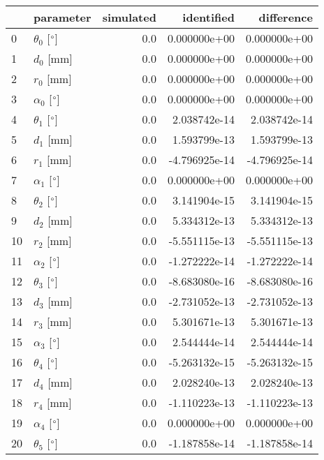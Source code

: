 \documentclass{standalone}%
\begin{document}
%
\normalsize%
\begin{tabular}{llrrr}
\toprule
{} &                 parameter & simulated &    identified &    difference \\
\midrule
0  &  $\theta_{0}$ [$\degree$] &       0.0 &  0.000000e+00 &  0.000000e+00 \\
1  &              $d_{0}$ [mm] &       0.0 &  0.000000e+00 &  0.000000e+00 \\
2  &              $r_{0}$ [mm] &       0.0 &  0.000000e+00 &  0.000000e+00 \\
3  &  $\alpha_{0}$ [$\degree$] &       0.0 &  0.000000e+00 &  0.000000e+00 \\
4  &  $\theta_{1}$ [$\degree$] &       0.0 &  2.038742e-14 &  2.038742e-14 \\
5  &              $d_{1}$ [mm] &       0.0 &  1.593799e-13 &  1.593799e-13 \\
6  &              $r_{1}$ [mm] &       0.0 & -4.796925e-14 & -4.796925e-14 \\
7  &  $\alpha_{1}$ [$\degree$] &       0.0 &  0.000000e+00 &  0.000000e+00 \\
8  &  $\theta_{2}$ [$\degree$] &       0.0 &  3.141904e-15 &  3.141904e-15 \\
9  &              $d_{2}$ [mm] &       0.0 &  5.334312e-13 &  5.334312e-13 \\
10 &              $r_{2}$ [mm] &       0.0 & -5.551115e-13 & -5.551115e-13 \\
11 &  $\alpha_{2}$ [$\degree$] &       0.0 & -1.272222e-14 & -1.272222e-14 \\
12 &  $\theta_{3}$ [$\degree$] &       0.0 & -8.683080e-16 & -8.683080e-16 \\
13 &              $d_{3}$ [mm] &       0.0 & -2.731052e-13 & -2.731052e-13 \\
14 &              $r_{3}$ [mm] &       0.0 &  5.301671e-13 &  5.301671e-13 \\
15 &  $\alpha_{3}$ [$\degree$] &       0.0 &  2.544444e-14 &  2.544444e-14 \\
16 &  $\theta_{4}$ [$\degree$] &       0.0 & -5.263132e-15 & -5.263132e-15 \\
17 &              $d_{4}$ [mm] &       0.0 &  2.028240e-13 &  2.028240e-13 \\
18 &              $r_{4}$ [mm] &       0.0 & -1.110223e-13 & -1.110223e-13 \\
19 &  $\alpha_{4}$ [$\degree$] &       0.0 &  0.000000e+00 &  0.000000e+00 \\
20 &  $\theta_{5}$ [$\degree$] &       0.0 & -1.187858e-14 & -1.187858e-14 \\

\end{tabular}
\end{document}
